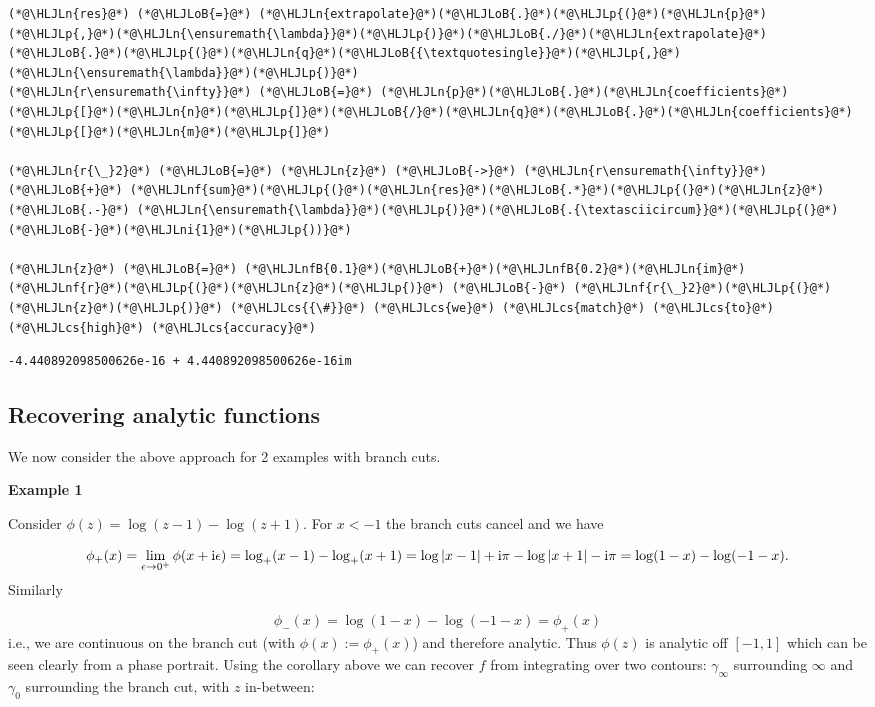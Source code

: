 \documentclass[12pt,a4paper]{article}
\newcommand{\HLJLn}[1]{#1}
\newcommand{\HLJLnf}[1]{\textcolor[RGB]{66,102,213}{#1}}
\newcommand{\HLJLnfB}[1]{\textcolor[RGB]{59,151,46}{#1}}
\newcommand{\HLJLni}[1]{\textcolor[RGB]{59,151,46}{#1}}
\newcommand{\HLJLoB}[1]{\textcolor[RGB]{102,102,102}{\textbf{#1}}}
\newcommand{\HLJLp}[1]{#1}
\newcommand{\HLJLcs}[1]{\textcolor[RGB]{153,153,119}{\textit{#1}}}
\def\I{ {\rm i} }
\begin{document}
\begin{lstlisting}
(*@\HLJLn{res}@*) (*@\HLJLoB{=}@*) (*@\HLJLn{extrapolate}@*)(*@\HLJLoB{.}@*)(*@\HLJLp{(}@*)(*@\HLJLn{p}@*)(*@\HLJLp{,}@*)(*@\HLJLn{\ensuremath{\lambda}}@*)(*@\HLJLp{)}@*)(*@\HLJLoB{./}@*)(*@\HLJLn{extrapolate}@*)(*@\HLJLoB{.}@*)(*@\HLJLp{(}@*)(*@\HLJLn{q}@*)(*@\HLJLoB{{\textquotesingle}}@*)(*@\HLJLp{,}@*)(*@\HLJLn{\ensuremath{\lambda}}@*)(*@\HLJLp{)}@*)
(*@\HLJLn{r\ensuremath{\infty}}@*) (*@\HLJLoB{=}@*) (*@\HLJLn{p}@*)(*@\HLJLoB{.}@*)(*@\HLJLn{coefficients}@*)(*@\HLJLp{[}@*)(*@\HLJLn{n}@*)(*@\HLJLp{]}@*)(*@\HLJLoB{/}@*)(*@\HLJLn{q}@*)(*@\HLJLoB{.}@*)(*@\HLJLn{coefficients}@*)(*@\HLJLp{[}@*)(*@\HLJLn{m}@*)(*@\HLJLp{]}@*)

(*@\HLJLn{r{\_}2}@*) (*@\HLJLoB{=}@*) (*@\HLJLn{z}@*) (*@\HLJLoB{->}@*) (*@\HLJLn{r\ensuremath{\infty}}@*) (*@\HLJLoB{+}@*) (*@\HLJLnf{sum}@*)(*@\HLJLp{(}@*)(*@\HLJLn{res}@*)(*@\HLJLoB{.*}@*)(*@\HLJLp{(}@*)(*@\HLJLn{z}@*) (*@\HLJLoB{.-}@*) (*@\HLJLn{\ensuremath{\lambda}}@*)(*@\HLJLp{)}@*)(*@\HLJLoB{.{\textasciicircum}}@*)(*@\HLJLp{(}@*)(*@\HLJLoB{-}@*)(*@\HLJLni{1}@*)(*@\HLJLp{))}@*)

(*@\HLJLn{z}@*) (*@\HLJLoB{=}@*) (*@\HLJLnfB{0.1}@*)(*@\HLJLoB{+}@*)(*@\HLJLnfB{0.2}@*)(*@\HLJLn{im}@*)
(*@\HLJLnf{r}@*)(*@\HLJLp{(}@*)(*@\HLJLn{z}@*)(*@\HLJLp{)}@*) (*@\HLJLoB{-}@*) (*@\HLJLnf{r{\_}2}@*)(*@\HLJLp{(}@*)(*@\HLJLn{z}@*)(*@\HLJLp{)}@*) (*@\HLJLcs{{\#}}@*) (*@\HLJLcs{we}@*) (*@\HLJLcs{match}@*) (*@\HLJLcs{to}@*) (*@\HLJLcs{high}@*) (*@\HLJLcs{accuracy}@*)
\end{lstlisting}

\begin{lstlisting}
-4.440892098500626e-16 + 4.440892098500626e-16im
\end{lstlisting}


\subsection{Recovering analytic functions}
We now consider the above approach for 2 examples with branch cuts.

\textbf{Example 1}

Consider $\phi(z) = \log(z-1) - \log(z+1)$. For $x < -1$ the branch cuts cancel and we have

\[
\phi_+(x) = \lim_{\epsilon \to 0^{+}} \phi(x + \I \epsilon) = \log_+(x-1) - \log_+(x+1) =
\log|x-1| + \I \pi - \log|x+1| - \I \pi = \log(1-x) - \log(-1-x).
\]
Similarly

\[
\phi_-(x) =  \log(1-x) - \log(-1-x) = \phi_+(x)
\]
i.e., we are continuous on the branch cut (with $\phi(x) := \phi_+(x)$) and therefore analytic. Thus $\phi(z)$ is analytic off $[-1,1]$ which can be seen clearly from a phase portrait. Using the corollary above we can recover $f$ from integrating over two contours: $\gamma_\infty$ surrounding $\infty$ and $\gamma_0$ surrounding the branch cut, with $z$ in-between:
\end{document}
